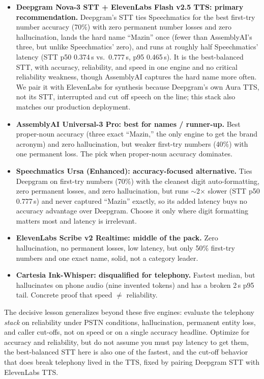 \documentclass[11pt]{article}
\begin{document}
\begin{itemize}
  \item \textbf{Deepgram Nova-3 STT + ElevenLabs Flash v2.5 TTS: primary
        recommendation.} Deepgram's STT ties Speechmatics for the best first-try
        number accuracy (70\%) with zero permanent number losses and zero
        hallucination, lands the hard name ``Mazin'' once (fewer than
        AssemblyAI's three, but unlike Speechmatics' zero), and runs at roughly
        half Speechmatics' latency (STT p50 0.374\,s vs.\ 0.777\,s, p95
        0.465\,s). It is the best-balanced STT, with accuracy, reliability, and
        speed in one engine and no critical reliability weakness, though
        AssemblyAI captures the hard name more often. We pair it with ElevenLabs
        for synthesis because Deepgram's own Aura TTS, not its STT, interrupted
        and cut off speech on the line; this stack also matches our production
        deployment.
  \item \textbf{AssemblyAI Universal-3 Pro: best for names / runner-up.} Best
        proper-noun accuracy (three exact ``Mazin,'' the only engine to get the
        brand acronym) and zero hallucination, but weaker first-try numbers
        (40\%) with one permanent loss. The pick when proper-noun accuracy
        dominates.
  \item \textbf{Speechmatics Ursa (Enhanced): accuracy-focused alternative.}
        Ties Deepgram on first-try numbers (70\%) with the cleanest digit
        auto-formatting, zero permanent losses, and zero hallucination, but runs
        $\sim$2$\times$ slower (STT p50 0.777\,s) and never captured ``Mazin''
        exactly, so its added latency buys no accuracy advantage over Deepgram.
        Choose it only where digit formatting matters most and latency is
        irrelevant.
  \item \textbf{ElevenLabs Scribe v2 Realtime: middle of the pack.} Zero
        hallucination, no permanent losses, low latency, but only 50\% first-try
        numbers and one exact name, solid, not a category leader.
  \item \textbf{Cartesia Ink-Whisper: disqualified for telephony.} Fastest
        median, but hallucinates on phone audio (nine invented tokens) and has a
        broken 2\,s p95 tail. Concrete proof that speed $\neq$ reliability.
\end{itemize}

The decisive lesson generalizes beyond these five engines: evaluate the telephony
\emph{stack} on reliability under PSTN conditions, hallucination, permanent
entity loss, and caller cut-offs, not on speed or on a single accuracy headline.
Optimize for accuracy and reliability, but do not assume you must pay latency to
get them, the best-balanced STT here is also one of the fastest, and the
cut-off behavior that does break telephony lived in the TTS, fixed by pairing
Deepgram STT with ElevenLabs TTS.
\end{document}
